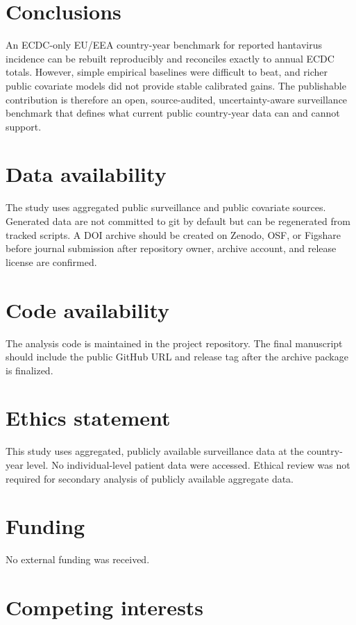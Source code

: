 \documentclass[11pt]{article}
\begin{document}
\section{Conclusions}

An ECDC-only EU/EEA country-year benchmark for reported hantavirus incidence can be rebuilt reproducibly and reconciles exactly to annual ECDC totals. However, simple empirical baselines were difficult to beat, and richer public covariate models did not provide stable calibrated gains. The publishable contribution is therefore an open, source-audited, uncertainty-aware surveillance benchmark that defines what current public country-year data can and cannot support.

\section*{Data availability}

The study uses aggregated public surveillance and public covariate sources. Generated data are not committed to git by default but can be regenerated from tracked scripts. A DOI archive should be created on Zenodo, OSF, or Figshare before journal submission after repository owner, archive account, and release license are confirmed.

\section*{Code availability}

The analysis code is maintained in the project repository. The final manuscript should include the public GitHub URL and release tag after the archive package is finalized.

\section*{Ethics statement}

This study uses aggregated, publicly available surveillance data at the country-year level. No individual-level patient data were accessed. Ethical review was not required for secondary analysis of publicly available aggregate data.

\section*{Funding}

No external funding was received.

\section*{Competing interests}
\end{document}
